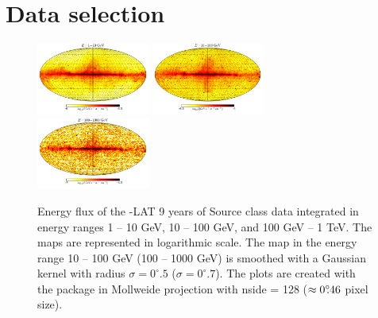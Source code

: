 \section{Data selection}


\begin{figure}[h]
\includegraphics[width=0.33\textwidth]{plots/Mollweide_data_source_range_0.pdf}
\includegraphics[width=0.33\textwidth]{plots/Mollweide_data_source_range_1.pdf}
\includegraphics[width=0.33\textwidth]{plots/Mollweide_data_source_range_2.pdf}
\caption{
Energy flux of the \Fermi-LAT 9 years of Source class data integrated in energy ranges 1 -- 10 GeV, 10 -- 100 GeV, and 100 GeV -- 1 TeV.
The maps are represented in logarithmic scale. 
The map in the energy range 10 -- 100 GeV (100 -- 1000 GeV) 
is smoothed with a Gaussian kernel with radius $\sigma = 0^\circ\!\!.5$ ($\sigma = 0^\circ\!\!.7$).
The plots are created with the \Healpix package \citep{2005ApJ...622..759G} in Mollweide projection with 
nside = 128 ($\approx 0^\circ\!\!.46$ pixel size). 
}
\label{fig:Maps_data}
\end{figure}

